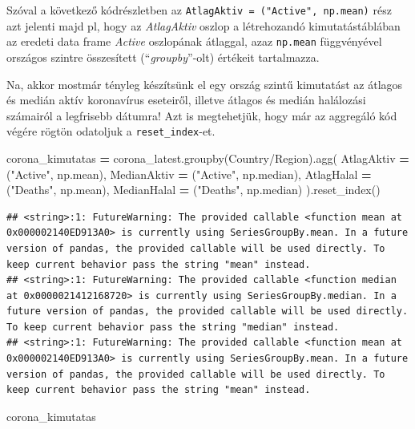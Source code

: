 \documentclass[
]{book}
\newenvironment{Shaded}{\begin{snugshade}}{\end{snugshade}}
\newcommand{\NormalTok}[1]{#1}
\newcommand{\OperatorTok}[1]{\textcolor[rgb]{0.81,0.36,0.00}{\textbf{#1}}}
\newcommand{\StringTok}[1]{\textcolor[rgb]{0.31,0.60,0.02}{#1}}
\begin{document}
Szóval a következő kódrészletben az \texttt{AtlagAktiv\ =\ ("Active",\ np.mean)} rész azt jelenti majd pl, hogy az \emph{AtlagAktiv} oszlop a létrehozandó kimutatástáblában az eredeti data frame \emph{Active} oszlopának átlaggal, azaz \texttt{np.mean} függvényével országos szintre összesített (``\emph{groupby}''-olt) értékeit tartalmazza.

Na, akkor mostmár tényleg készítsünk el egy ország szintű kimutatást az átlagos és medián aktív koronavírus eseteiről, illetve átlagos és medián halálozási számairól a legfrisebb dátumra! Azt is megtehetjük, hogy már az aggregáló kód végére rögtön odatoljuk a \texttt{reset\_index}-et.

\begin{Shaded}
\begin{Highlighting}[]
\NormalTok{corona\_kimutatas }\OperatorTok{=}\NormalTok{ corona\_latest.groupby(}\StringTok{\textquotesingle{}Country/Region\textquotesingle{}}\NormalTok{).agg(}
\NormalTok{  AtlagAktiv }\OperatorTok{=}\NormalTok{ (}\StringTok{"Active"}\NormalTok{, np.mean),}
\NormalTok{  MedianAktiv }\OperatorTok{=}\NormalTok{ (}\StringTok{"Active"}\NormalTok{, np.median),}
\NormalTok{  AtlagHalal }\OperatorTok{=}\NormalTok{ (}\StringTok{"Deaths"}\NormalTok{, np.mean),}
\NormalTok{  MedianHalal }\OperatorTok{=}\NormalTok{ (}\StringTok{"Deaths"}\NormalTok{, np.median)}
\NormalTok{).reset\_index()}
\end{Highlighting}
\end{Shaded}

\begin{verbatim}
## <string>:1: FutureWarning: The provided callable <function mean at 0x000002140ED913A0> is currently using SeriesGroupBy.mean. In a future version of pandas, the provided callable will be used directly. To keep current behavior pass the string "mean" instead.
## <string>:1: FutureWarning: The provided callable <function median at 0x0000021412168720> is currently using SeriesGroupBy.median. In a future version of pandas, the provided callable will be used directly. To keep current behavior pass the string "median" instead.
## <string>:1: FutureWarning: The provided callable <function mean at 0x000002140ED913A0> is currently using SeriesGroupBy.mean. In a future version of pandas, the provided callable will be used directly. To keep current behavior pass the string "mean" instead.
\end{verbatim}

\begin{Shaded}
\begin{Highlighting}[]
\NormalTok{corona\_kimutatas}
\end{Highlighting}
\end{Shaded}
\end{document}
